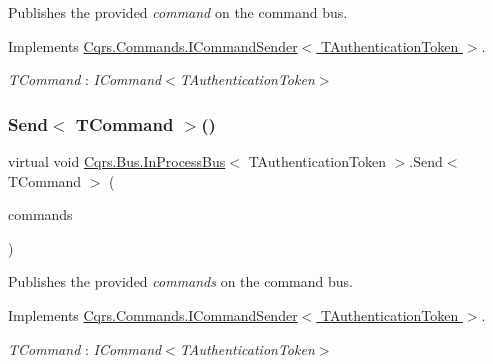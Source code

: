 Publishes the provided {\itshape command}  on the command bus. 



Implements \hyperlink{interfaceCqrs_1_1Commands_1_1ICommandSender_a551d69f8679399fc0ce0fd99dead507a}{Cqrs.\+Commands.\+I\+Command\+Sender$<$ T\+Authentication\+Token $>$}.

\begin{Desc}
\item[Type Constraints]\begin{description}
\item[{\em T\+Command} : {\em I\+Command$<$T\+Authentication\+Token$>$}]\end{description}
\end{Desc}
\mbox{\label{classCqrs_1_1Bus_1_1InProcessBus_ae5dae5f2445387280c974ec181167055}} 
\subsubsection{\texorpdfstring{Send$<$ T\+Command $>$()}{Send< TCommand >()}\hspace{0.1cm}{\footnotesize\ttfamily [2/2]}}
{\footnotesize\ttfamily virtual void \hyperlink{classCqrs_1_1Bus_1_1InProcessBus}{Cqrs.\+Bus.\+In\+Process\+Bus}$<$ T\+Authentication\+Token $>$.Send$<$ T\+Command $>$ (\begin{DoxyParamCaption}\item[{I\+Enumerable$<$ T\+Command $>$}]{commands }\end{DoxyParamCaption})\hspace{0.3cm}{\ttfamily [virtual]}}



Publishes the provided {\itshape commands}  on the command bus. 



Implements \hyperlink{interfaceCqrs_1_1Commands_1_1ICommandSender_a3fb3ec40a3e862f721a7c9204e67e832}{Cqrs.\+Commands.\+I\+Command\+Sender$<$ T\+Authentication\+Token $>$}.

\begin{Desc}
\item[Type Constraints]\begin{description}
\item[{\em T\+Command} : {\em I\+Command$<$T\+Authentication\+Token$>$}]\end{description}
\end{Desc}
\mbox{\label{classCqrs_1_1Bus_1_1InProcessBus_a506d617dc7ec3838791a91e09b73b8ce}} 
